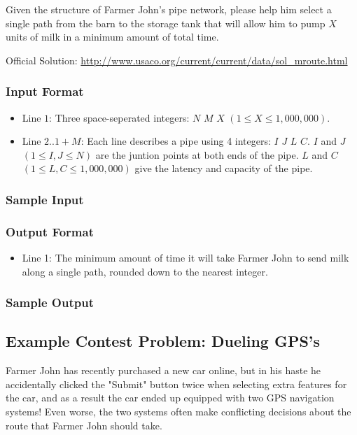 Given the structure of Farmer John's pipe network, please help him select a single path from the barn to the storage tank that will allow him to pump $X$ units
of milk in a minimum amount of total time.

Official Solution: \url{http://www.usaco.org/current/current/data/sol_mroute.html}

\subsubsection{Input Format}
\begin{itemize}
	\item Line $1$: Three space-seperated integers: $N$ $M$ $X$ $(1 \leq X \leq 1,000,000)$.
	\item Line $2..1+M$: Each line describes a pipe using 4 integers: $I$ $J$ $L$ $C$.
			$I$ and $J$ $(1 \leq I,J \leq N)$ are the juntion points at both ends of the pipe.
			$L$ and $C$ $(1 \leq L,C \leq 1,000,000)$ give the latency and capacity of the pipe.
\end{itemize}

\subsubsection{Sample Input}

\subsubsection{Output Format}
\begin{itemize}
	\item Line 1: The minimum amount of time it will take Farmer John to send milk along a single path, 
			rounded down to the nearest integer.
\end{itemize}

\subsubsection{Sample Output}

\subsection{Example Contest Problem: Dueling GPS's\cite{gpsduel}}
Farmer John has recently purchased a new car online, but in his haste he accidentally clicked the "Submit" button twice when selecting extra
features for the car, and as a result the car ended up equipped with two GPS navigation systems!  
Even worse, the two systems often make conflicting decisions about the route that Farmer John should take.

